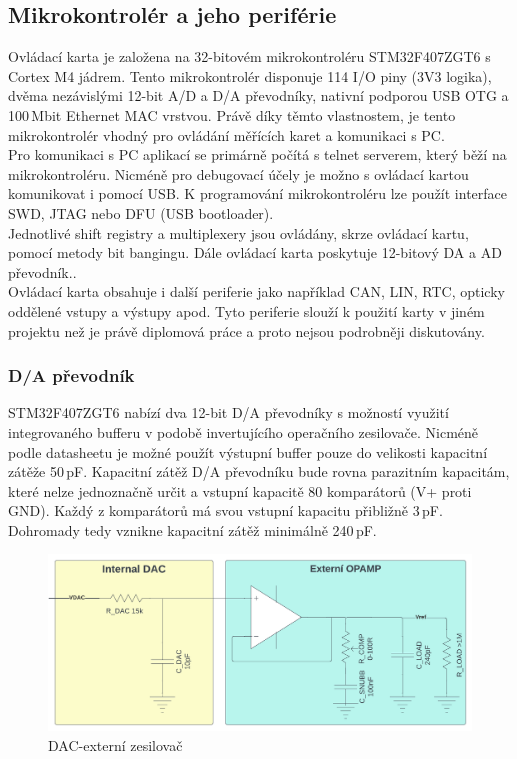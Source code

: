     \subsection{Mikrokontrolér a jeho periférie}
    Ovládací karta je založena na 32-bitovém mikrokontroléru STM32F407ZGT6 s Cortex M4 jádrem.
    Tento mikrokontrolér disponuje 114 I/O piny (3V3 logika), dvěma nezávislými 12-bit A/D a D/A převodníky,
    nativní podporou USB OTG a 100\,Mbit Ethernet MAC vrstvou. Právě díky těmto vlastnostem, je tento
    mikrokontrolér vhodný pro ovládání měřících karet a komunikaci s PC.\\

    Pro komunikaci s PC aplikací se primárně počítá s telnet serverem,
    který běží na mikrokontroléru. Nicméně pro debugovací
    účely je možno s ovládací kartou komunikovat i pomocí USB.
    K programování mikrokontroléru lze použít interface SWD, JTAG nebo DFU (USB bootloader).\\

    Jednotlivé shift registry a multiplexery jsou ovládány, skrze ovládací kartu, pomocí metody bit bangingu.
    Dále ovládací karta poskytuje 12-bitový DA a AD převodník.\cite{MARTINT}.\\

    Ovládací karta obsahuje i další periferie jako například CAN, LIN, RTC, opticky oddělené vstupy a výstupy apod.
    Tyto periferie slouží k použití karty v jiném projektu než je právě diplomová práce a proto nejsou podrobněji diskutovány.


    \subsubsection{D/A převodník}
    STM32F407ZGT6 nabízí dva 12-bit D/A převodníky s možností využití integrovaného bufferu v podobě
    invertujícího operačního zesilovače. Nicméně podle datasheetu
    je možné použít výstupní buffer pouze do velikosti kapacitní zátěže 50\,pF.
    Kapacitní zátěž D/A převodníku bude rovna parazitním kapacitám, které nelze jednoznačně určit
    a vstupní kapacitě 80 komparátorů (V+ proti GND). Každý z komparátorů má svou vstupní kapacitu
    přibližně 3\,pF. Dohromady tedy vznikne kapacitní zátěž minimálně 240\,pF.\cite{DAC}\\
    \begin{figure}[ht!]
        \centering
        \includegraphics[width = 1\textwidth]{obrazky/DAC_OPAMP.png}
        \caption{DAC-externí zesilovač}
        \label{fig: DAC-externí zesilovač}
        
    \end{figure}


